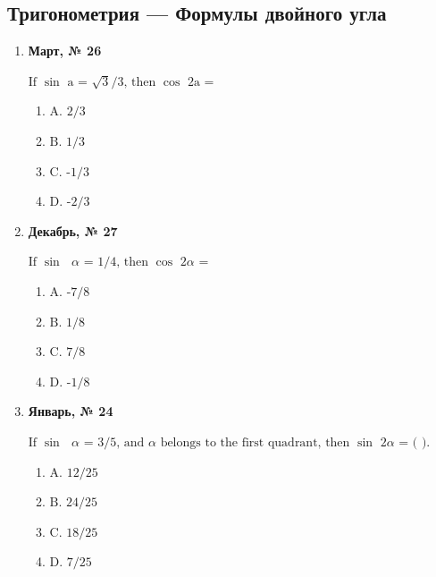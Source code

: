 \subsection*{Тригонометрия — Формулы двойного угла}
\begin{enumerate}
\item \textbf{Март, № 26} \par \smallskip
$\displaystyle \text{If }\sin\text{ a = }\sqrt{3}\text{/3, then }\cos\text{ 2a =}$
\begin{enumerate}
\item $\displaystyle \text{A. 2/3}$
\item $\displaystyle \text{B. 1/3}$
\item $\displaystyle \text{C. -1/3}$
\item $\displaystyle \text{D. -2/3}$
\end{enumerate}
\item \textbf{Декабрь, № 27} \par \smallskip
$\displaystyle \text{If }\sin\text{ }\alpha\text{  = 1/4, then }\cos\text{ 2}\alpha\text{  =}$
\begin{enumerate}
\item $\displaystyle \text{A. -7/8}$
\item $\displaystyle \text{B. 1/8}$
\item $\displaystyle \text{C. 7/8}$
\item $\displaystyle \text{D. -1/8}$
\end{enumerate}
\item \textbf{Январь, № 24} \par \smallskip
$\displaystyle \text{If }\sin\text{ }\alpha\text{  = 3/5, and }\alpha\text{  belongs to the first quadrant, then }\sin\text{ 2}\alpha\text{  = ( ).}$
\begin{enumerate}
\item $\displaystyle \text{A. 12/25}$
\item $\displaystyle \text{B. 24/25}$
\item $\displaystyle \text{C. 18/25}$
\item $\displaystyle \text{D. 7/25}$
\end{enumerate}
\end{enumerate}

